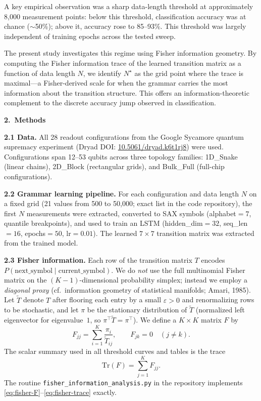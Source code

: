 \documentclass[11pt,a4paper]{article}
\begin{document}
A key empirical observation was a sharp data-length threshold at approximately 8{,}000 measurement points: below this threshold, classification accuracy was at chance ($\sim$50\%); above it, accuracy rose to 85--93\%. This threshold was largely independent of training epochs across the tested sweep.

The present study investigates this regime using Fisher information geometry. By computing the Fisher information trace of the learned transition matrix as a function of data length $N$, we identify $N^\star$ as the grid point where the trace is maximal---a Fisher-derived scale for when the grammar carries the most information about the transition structure. This offers an information-theoretic complement to the discrete accuracy jump observed in classification.

\vspace{0.5em}
\textbf{2.\ Methods}

\textbf{2.1 Data.} All 28 readout configurations from the Google Sycamore quantum supremacy experiment (Dryad DOI: \href{https://doi.org/10.5061/dryad.k6t1rj8}{10.5061/dryad.k6t1rj8}) were used. Configurations span 12--53 qubits across three topology families: 1D\_Snake (linear chains), 2D\_Block (rectangular grids), and Bulk\_Full (full-chip configurations).

\textbf{2.2 Grammar learning pipeline.} For each configuration and data length $N$ on a fixed grid (21 values from 500 to 50{,}000; exact list in the code repository), the first $N$ measurements were extracted, converted to SAX symbols (alphabet${}=7$, quantile breakpoints), and used to train an LSTM (hidden\_dim${}=32$, seq\_len${}=16$, epochs${}=50$, lr${}=0.01$). The learned $7\times 7$ transition matrix was extracted from the trained model.

\textbf{2.3 Fisher information.} Each row of the transition matrix $T$ encodes $P(\text{next\_symbol}\mid\text{current\_symbol})$. We do \emph{not} use the full multinomial Fisher matrix on the $(K-1)$-dimensional probability simplex; instead we employ a \emph{diagonal proxy} (cf.\ information geometry of statistical manifolds; Amari, 1985). Let $\tilde{T}$ denote $T$ after flooring each entry by a small $\varepsilon>0$ and renormalizing rows to be stochastic, and let $\pi$ be the stationary distribution of $\tilde{T}$ (normalized left eigenvector for eigenvalue~$1$, so $\pi^\top \tilde{T}=\pi^\top$). We define a $K\times K$ matrix $F$ by
\begin{equation}
\label{eq:fisher-F}
F_{jj}=\sum_{i=1}^{K}\frac{\pi_i}{\tilde{T}_{ij}}, \qquad F_{jk}=0 \quad (j\neq k).
\end{equation}
The scalar summary used in all threshold curves and tables is the trace
\begin{equation}
\label{eq:fisher-trace}
\mathrm{Tr}(F)=\sum_{j=1}^{K}F_{jj}.
\end{equation}
The routine \texttt{fisher\_information\_analysis.py} in the repository implements \eqref{eq:fisher-F}--\eqref{eq:fisher-trace} exactly.
\end{document}
